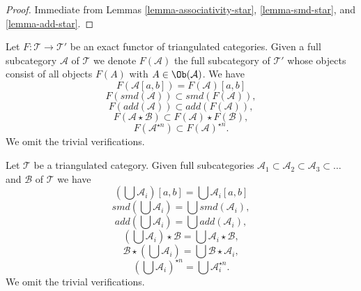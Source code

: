 \begin{proof}
Immediate from Lemmas \ref{lemma-associativity-star}, \ref{lemma-smd-star}, and
\ref{lemma-add-star}.
\end{proof}

\begin{remark}
\label{remark-operations-functor}
Let $F : \mathcal{T} \to \mathcal{T}'$ be an exact functor of triangulated
categories. Given a full subcategory $\mathcal{A}$ of $\mathcal{T}$ we denote
$F(\mathcal{A})$ the full subcategory of $\mathcal{T}'$ whose objects
consist of all objects $F(A)$ with $A \in \Ob(\mathcal{A})$. We have
$$
F(\mathcal{A}[a, b]) = F(\mathcal{A})[a, b]
$$
$$
F(smd(\mathcal{A})) \subset smd(F(\mathcal{A})),
$$
$$
F(add(\mathcal{A})) \subset add(F(\mathcal{A})),
$$
$$
F(\mathcal{A} \star \mathcal{B}) \subset F(\mathcal{A}) \star F(\mathcal{B}),
$$
$$
F(\mathcal{A}^{\star n}) \subset F(\mathcal{A})^{\star n}.
$$
We omit the trivial verifications.
\end{remark}

\begin{remark}
\label{remark-operations-unions}
Let $\mathcal{T}$ be a triangulated category. Given full subcategories
$\mathcal{A}_1 \subset \mathcal{A}_2 \subset \mathcal{A}_3 \subset \ldots$
and $\mathcal{B}$ of $\mathcal{T}$ we have
$$
\left(\bigcup \mathcal{A}_i\right)[a, b] = \bigcup \mathcal{A}_i[a, b]
$$
$$
smd\left(\bigcup \mathcal{A}_i\right) = \bigcup smd(\mathcal{A}_i),
$$
$$
add\left(\bigcup \mathcal{A}_i\right) = \bigcup add(\mathcal{A}_i),
$$
$$
\left(\bigcup \mathcal{A}_i\right) \star \mathcal{B} =
\bigcup \mathcal{A}_i \star \mathcal{B},
$$
$$
\mathcal{B} \star \left(\bigcup \mathcal{A}_i\right) =
\bigcup \mathcal{B} \star \mathcal{A}_i,
$$
$$
\left(\bigcup \mathcal{A}_i\right)^{\star n} =
\bigcup \mathcal{A}_i^{\star n}.
$$
We omit the trivial verifications.
\end{remark}

